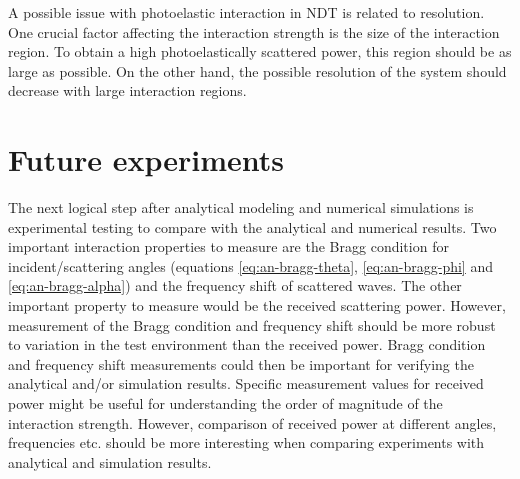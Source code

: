 \documentclass[11pt,twoside]{eitExjobb}
\begin{document}
	A possible issue with photoelastic interaction in NDT is related to resolution. One crucial factor affecting the interaction strength is the size of the interaction region. To obtain a high photoelastically scattered power, this region should be as large as possible. On the other hand, the possible resolution of the system should decrease with large interaction regions. 
	
	\section{Future experiments}
	The next logical step after analytical modeling and numerical simulations is experimental testing to compare with the analytical and numerical results. Two important interaction properties to measure are the Bragg condition for incident/scattering angles (equations \eqref{eq:an-bragg-theta}, \eqref{eq:an-bragg-phi} and \eqref{eq:an-bragg-alpha}) and the frequency shift of scattered waves. The other important property to measure would be the received scattering power. However, measurement of the Bragg condition and frequency shift should be more robust to variation in the test environment than the received power. Bragg condition and frequency shift measurements  could then be important for verifying the analytical and/or simulation results. Specific measurement values for received power might be useful for understanding the order of magnitude of the interaction strength. However, comparison of received power at different angles, frequencies etc. should be more interesting when comparing experiments with analytical and simulation results.
	
\end{document}
